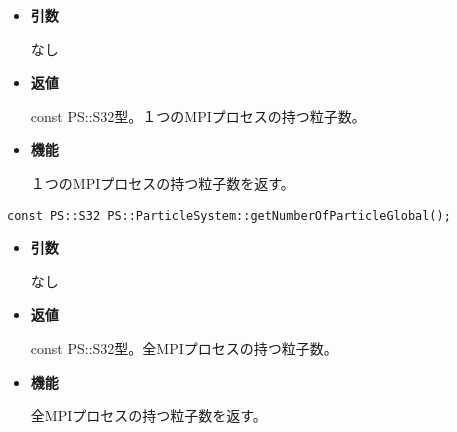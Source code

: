 \begin{itemize}

\item {\bf 引数}

なし

\item {\bf 返値}

const PS::S32型。１つのMPIプロセスの持つ粒子数。

\item {\bf 機能}

１つのMPIプロセスの持つ粒子数を返す。

\end{itemize}


\begin{screen}
\begin{verbatim}
const PS::S32 PS::ParticleSystem::getNumberOfParticleGlobal();
\end{verbatim}
\end{screen}

\begin{itemize}

\item {\bf 引数}

なし

\item {\bf 返値}

const PS::S32型。全MPIプロセスの持つ粒子数。

\item {\bf 機能}

全MPIプロセスの持つ粒子数を返す。

\end{itemize}


